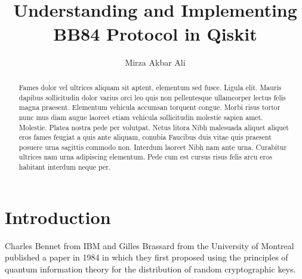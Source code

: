 \documentclass[journal,english]{IEEEtran}
\newif\ifprintanswers
\begin{document}
\title{\hrulefill \\ \Large Understanding and Implementing BB84 Protocol in Qiskit}
\author{Mirza Akbar Ali \\ \hrulefill}
\maketitle
\printanswerstrue
\begin{abstract}
Fames dolor vel ultrices aliquam sit aptent, elementum sed fusce. Ligula elit. Mauris dapibus sollicitudin dolor varius orci leo quis non pellentesque ullamcorper lectus felis magna praesent. Elementum vehicula accumsan torquent congue. Morbi risus tortor nunc mus diam augue laoreet etiam vehicula sollicitudin molestie sapien amet. Molestie. Platea nostra pede per volutpat. Netus litora Nibh malesuada aliquet aliquet eros fames feugiat a quis ante aliquam, conubia Faucibus duis vitae quis praesent posuere urna sagittis commodo non. Interdum laoreet Nibh nam ante urna. Curabitur ultrices nam urna adipiscing elementum. Pede cum est cursus risus felis arcu eros habitant interdum neque per.
\end{abstract}
\section{Introduction}
\par \noindent Charles Bennet from IBM and Gilles Brassard from the University of Montreal published a paper in 1984 in which they first proposed using the principles of quantum information theory for the distribution of random cryptographic keys.
\end{document}
